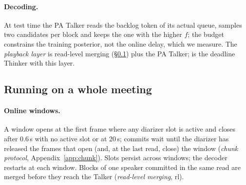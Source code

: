 \paragraph{Decoding.} At test time the PA Talker reads the backlog token of its actual queue, samples two candidates
per block and keeps the one with the higher $f$; the budget constrains the training posterior, not the online delay,
which we measure. The \emph{playback layer} is read-level merging (\S\ref{sec:method-online}) plus the PA Talker;
\sys{} is the deadline Thinker with this layer.

\subsection{Running on a whole meeting}
\label{sec:method-online}

\paragraph{Online windows.} A window opens at the first frame where any diarizer slot is active and closes after
0.6\,s with no active slot or at 20\,s; commits wait until the diarizer has released the frames that open (and, at the
last read, close) the window (\emph{chunk protocol}, Appendix~\ref{app:chunk}). Slots persist across windows; the
decoder restarts at each window. Blocks of one speaker
committed in the same read are merged before they reach the Talker (\emph{read-level merging}, rl).
